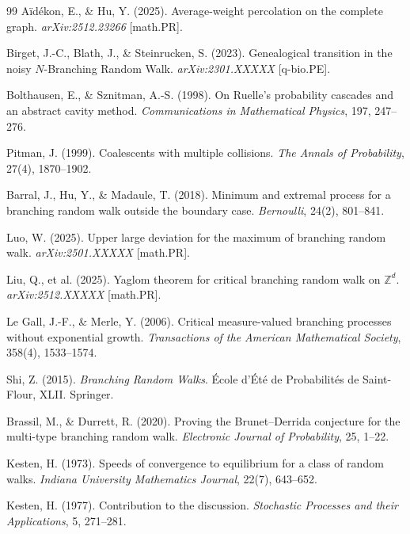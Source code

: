 \begin{thebibliography}{99}
Aïdékon, E., \& Hu, Y. (2025). Average-weight percolation on the complete graph. \textit{arXiv:2512.23266} [math.PR].

Birget, J.-C., Blath, J., \& Steinrucken, S. (2023). Genealogical transition in the noisy $N$-Branching Random Walk. \textit{arXiv:2301.XXXXX} [q-bio.PE].

Bolthausen, E., \& Sznitman, A.-S. (1998). On Ruelle's probability cascades and an abstract cavity method. \textit{Communications in Mathematical Physics}, 197, 247--276.

Pitman, J. (1999). Coalescents with multiple collisions. \textit{The Annals of Probability}, 27(4), 1870--1902.

Barral, J., Hu, Y., \& Madaule, T. (2018). Minimum and extremal process for a branching random walk outside the boundary case. \textit{Bernoulli}, 24(2), 801--841.

Luo, W. (2025). Upper large deviation for the maximum of branching random walk. \textit{arXiv:2501.XXXXX} [math.PR].

Liu, Q., et al. (2025). Yaglom theorem for critical branching random walk on $\mathbb{Z}^d$. \textit{arXiv:2512.XXXXX} [math.PR].

Le Gall, J.-F., \& Merle, Y. (2006). Critical measure-valued branching processes without exponential growth. \textit{Transactions of the American Mathematical Society}, 358(4), 1533--1574.

Shi, Z. (2015). \textit{Branching Random Walks}. \'Ecole d'Été de Probabilités de Saint-Flour, XLII. Springer.

Brassil, M., \& Durrett, R. (2020). Proving the Brunet--Derrida conjecture for the multi-type branching random walk. \textit{Electronic Journal of Probability}, 25, 1--22.

Kesten, H. (1973). Speeds of convergence to equilibrium for a class of random walks. \textit{Indiana University Mathematics Journal}, 22(7), 643--652.

Kesten, H. (1977). Contribution to the discussion. \textit{Stochastic Processes and their Applications}, 5, 271--281.


\end{thebibliography}
